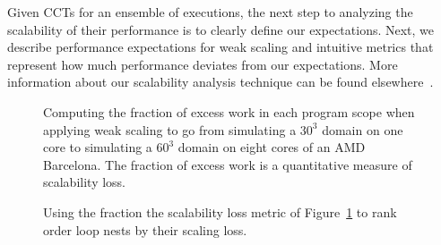 \documentclass[12pt]{article}
\begin{document}
Given CCTs for an ensemble of executions, the next step to analyzing the scalability of their 
performance is to clearly define our
expectations. Next, we describe performance expectations for weak scaling and intuitive metrics that represent how much performance deviates from our expectations. More information about our scalability analysis technique can be found elsewhere~\cite{coarfa:ICS07}.

\begin{figure}[t]
\caption{Computing the fraction of excess work in each program scope when applying weak scaling to go from simulating a $30^3$ domain on one core to simulating a $60^3$ domain on eight cores of an AMD Barcelona. The fraction of excess work is a quantitative measure of scalability loss.}
\label{fig:scaling-loss}
\end{figure}

\begin{figure}[t]
\caption{Using the fraction the scalability loss metric of Figure~\ref{fig:scaling-loss} to rank order loop nests by their scaling loss.}
\label{fig:scaling-loss-2}
\end{figure}
\end{document}
